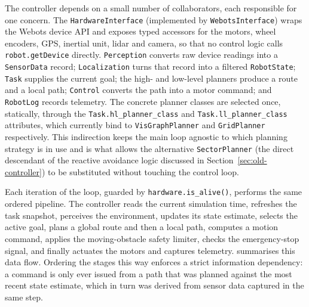 The controller depends on a small number of collaborators, each responsible for one concern. The \texttt{HardwareInterface} (implemented by \texttt{WebotsInterface}) wraps the Webots device API and exposes typed accessors for the motors, wheel encoders, GPS, inertial unit, lidar and camera, so that no control logic calls \texttt{robot.getDevice} directly. \texttt{Perception} converts raw device readings into a \texttt{SensorData} record; \texttt{Localization} turns that record into a filtered \texttt{RobotState}; \texttt{Task} supplies the current goal; the high- and low-level planners produce a route and a local path; \texttt{Control} converts the path into a motor command; and \texttt{RobotLog} records telemetry. The concrete planner classes are selected once, statically, through the \texttt{Task.hl\_planner\_class} and \texttt{Task.ll\_planner\_class} attributes, which currently bind to \texttt{VisGraphPlanner} and \texttt{GridPlanner} respectively. This indirection keeps the main loop agnostic to which planning strategy is in use and is what allows the alternative \texttt{SectorPlanner} (the direct descendant of the reactive avoidance logic discussed in Section~\ref{sec:old-controller}) to be substituted without touching the control loop.

Each iteration of the loop, guarded by \texttt{hardware.is\_alive()}, performs the same ordered pipeline. The controller reads the current simulation time, refreshes the task snapshot, perceives the environment, updates its state estimate, selects the active goal, plans a global route and then a local path, computes a motion command, applies the moving-obstacle safety limiter, checks the emergency-stop signal, and finally actuates the motors and captures telemetry.  summarises this data flow. Ordering the stages this way enforces a strict information dependency: a command is only ever issued from a path that was planned against the most recent state estimate, which in turn was derived from sensor data captured in the same step.

